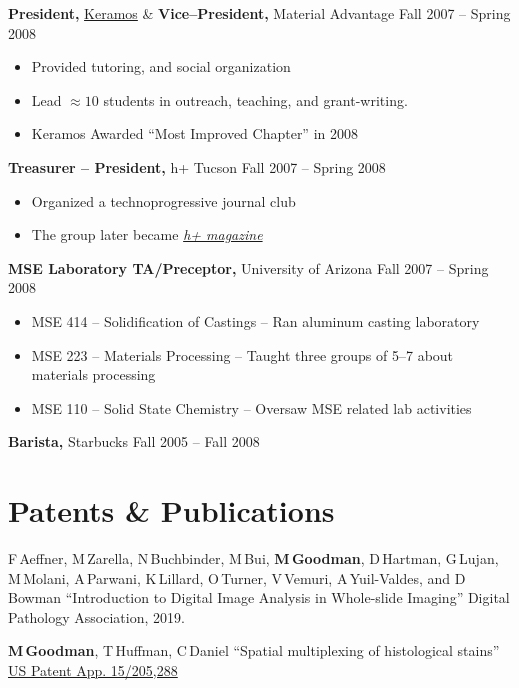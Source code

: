 \documentclass{res}
\begin{document}
\begin{resume}
{\bf President,} \href{https://ceramics.org/members/member-communities/classes/keramos}{Keramos} \& {\bf Vice--President,} Material Advantage \hfill Fall 2007 -- Spring 2008
\begin{itemize} \itemsep -2pt
  \item Provided tutoring, and social organization
  \item Lead $\approx10$ students in outreach, teaching, and grant-writing.
  \item Keramos Awarded ``Most Improved Chapter'' in 2008
\end{itemize}

{\bf Treasurer -- President,} h+ Tucson \hfill Fall 2007 -- Spring 2008
\begin{itemize} \itemsep -2pt
  \item Organized a technoprogressive journal club
  \item The group later became \href{http://hplusmagazine.com/}{\textit{h+ magazine}}
\end{itemize}

{\bf MSE Laboratory TA/Preceptor,} University of Arizona \hfill Fall 2007 -- Spring 2008
\begin{itemize} \itemsep -2pt
  \item MSE 414 -- Solidification of Castings -- Ran aluminum casting laboratory
  \item MSE 223 -- Materials Processing -- Taught three groups of 5--7 about materials processing
  \item MSE 110 -- Solid State Chemistry -- Oversaw MSE related lab activities
\end{itemize}

{\bf Barista,} Starbucks \hfill Fall 2005 -- Fall 2008

\section{Patents \& Publications}

  F\,Aeffner, M\,Zarella, N\,Buchbinder, M\,Bui, \textbf{M\,Goodman}, 
  D\,Hartman, G\,Lujan, M\,Molani, A\,Parwani, K\,Lillard, O\,Turner,
  V\,Vemuri, A\,Yuil-Valdes, and D\,Bowman
  ``Introduction to Digital Image Analysis in Whole-slide Imaging''
  Digital Pathology Association, 2019.

  \textbf{M\,Goodman}, T\,Huffman, C\,Daniel
  ``Spatial multiplexing of histological stains''
  \href{https://patents.google.com/patent/US20170011511A1/en}{US Patent App. 15/205,288}


\end{resume}
\end{document}
